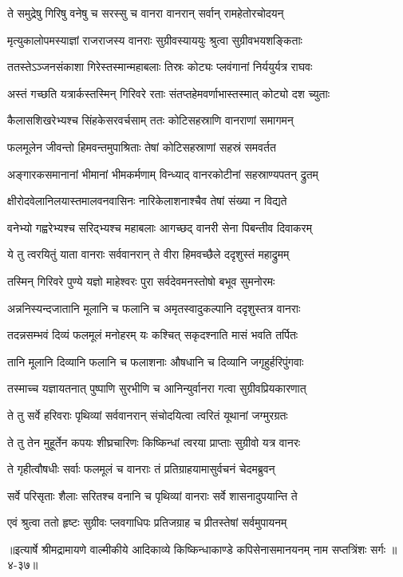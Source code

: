 \twolineshloka
{ते समुद्रेषु गिरिषु वनेषु च सरस्सु च}
{वानरा वानरान् सर्वान् रामहेतोरचोदयन्} %

\twolineshloka
{मृत्युकालोपमस्याज्ञां राजराजस्य वानराः}
{सुग्रीवस्याययुः श्रुत्वा सुग्रीवभयशङ्किताः} %

\twolineshloka
{ततस्तेऽञ्जनसंकाशा गिरेस्तस्मान्महाबलाः}
{तिस्रः कोट्यः प्लवंगानां निर्ययुर्यत्र राघवः} %

\twolineshloka
{अस्तं गच्छति यत्रार्कस्तस्मिन् गिरिवरे रताः}
{संतप्तहेमवर्णाभास्तस्मात् कोट्यो दश च्युताः} %

\twolineshloka
{कैलासशिखरेभ्यश्च सिंहकेसरवर्चसाम्}
{ततः कोटिसहस्राणि वानराणां समागमन्} %

\twolineshloka
{फलमूलेन जीवन्तो हिमवन्तमुपाश्रिताः}
{तेषां कोटिसहस्राणां सहस्रं समवर्तत} %

\twolineshloka
{अङ्गारकसमानानां भीमानां भीमकर्मणाम्}
{विन्ध्याद् वानरकोटीनां सहस्राण्यपतन् द्रुतम्} %

\twolineshloka
{क्षीरोदवेलानिलयास्तमालवनवासिनः}
{नारिकेलाशनाश्चैव तेषां संख्या न विद्यते} %

\twolineshloka
{वनेभ्यो गह्वरेभ्यश्च सरिद्भ्यश्च महाबलाः}
{आगच्छद् वानरी सेना पिबन्तीव दिवाकरम्} %

\twolineshloka
{ये तु त्वरयितुं याता वानराः सर्ववानरान्}
{ते वीरा हिमवच्छैले ददृशुस्तं महाद्रुमम्} %

\twolineshloka
{तस्मिन् गिरिवरे पुण्ये यज्ञो माहेश्वरः पुरा}
{सर्वदेवमनस्तोषो बभूव सुमनोरमः} %

\twolineshloka
{अन्ननिस्यन्दजातानि मूलानि च फलानि च}
{अमृतस्वादुकल्पानि ददृशुस्तत्र वानराः} %

\twolineshloka
{तदन्नसम्भवं दिव्यं फलमूलं मनोहरम्}
{यः कश्चित् सकृदश्नाति मासं भवति तर्पितः} %

\twolineshloka
{तानि मूलानि दिव्यानि फलानि च फलाशनाः}
{औषधानि च दिव्यानि जगृहुर्हरिपुंगवाः} %

\twolineshloka
{तस्माच्च यज्ञायतनात् पुष्पाणि सुरभीणि च}
{आनिन्युर्वानरा गत्वा सुग्रीवप्रियकारणात्} %

\twolineshloka
{ते तु सर्वे हरिवराः पृथिव्यां सर्ववानरान्}
{संचोदयित्वा त्वरितं यूथानां जग्मुरग्रतः} %

\twolineshloka
{ते तु तेन मुहूर्तेन कपयः शीघ्रचारिणः}
{किष्किन्धां त्वरया प्राप्ताः सुग्रीवो यत्र वानरः} %

\twolineshloka
{ते गृहीत्वौषधीः सर्वाः फलमूलं च वानराः}
{तं प्रतिग्राहयामासुर्वचनं चेदमब्रुवन्} %

\twolineshloka
{सर्वे परिसृताः शैलाः सरितश्च वनानि च}
{पृथिव्यां वानराः सर्वे शासनादुपयान्ति ते} %

\twolineshloka
{एवं श्रुत्वा ततो हृष्टः सुग्रीवः प्लवगाधिपः}
{प्रतिजग्राह च प्रीतस्तेषां सर्वमुपायनम्} %


॥इत्यार्षे श्रीमद्रामायणे वाल्मीकीये आदिकाव्ये किष्किन्धाकाण्डे कपिसेनासमानयनम् नाम सप्तत्रिंशः सर्गः ॥४-३७॥

